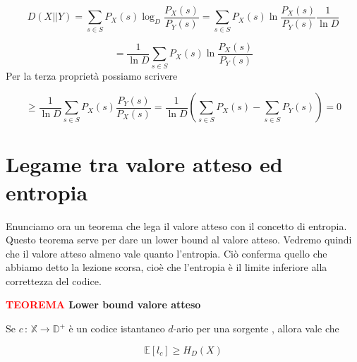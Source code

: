 \documentclass[12pt]{report}
\begin{document}
    \begin{dimo}
        $$D(X||Y) = \sum_{s \in S} P_X(s) \log_D{\frac{P_X(s)}{P_Y(s)}} = \sum_{s \in S} P_X(s) \ln{\frac{P_X(s)}{P_Y(s)}} \frac{1}{\ln{D}}$$

        $$= \frac{1}{\ln{D}} \sum_{s \in S} P_X(s) \ln{\frac{P_X(s)}{P_Y(s)}} $$
        Per la terza proprietà possiamo scrivere

        $$\geq \frac{1}{\ln{D}} \sum_{s \in S} P_X(s) \frac{P_Y(s)}{P_X(s)} =  \frac{1}{\ln{D}} (\sum_{s \in S} P_X(s) - \sum_{s \in S} P_Y(s)) = 0 $$
    \end{dimo}

    \section{Legame tra valore atteso ed entropia}

    Enunciamo ora un teorema che lega il valore atteso con il concetto di entropia. Questo teorema serve per dare un lower bound al valore atteso. Vedremo quindi che il valore atteso almeno vale quanto l'entropia. Ciò conferma quello che abbiamo detto la lezione scorsa, cioè che l'entropia è il limite inferiore alla correttezza del codice.

    \vspace{5px}
    \begin{tcolorbox}
        \textbf{\textcolor{red}{TEOREMA} Lower bound valore atteso }
        \vspace{5px}
        \begin{center}
            Se $c\, :\, \mathbb{X} \rightarrow \mathbb{D}^+$ è un codice istantaneo $d$-ario per una sorgente \modello , allora vale che

            $$\mathbb{E}[l_c] \geq H_D(X)$$
        \end{center}
    \end{tcolorbox}
\end{document}
